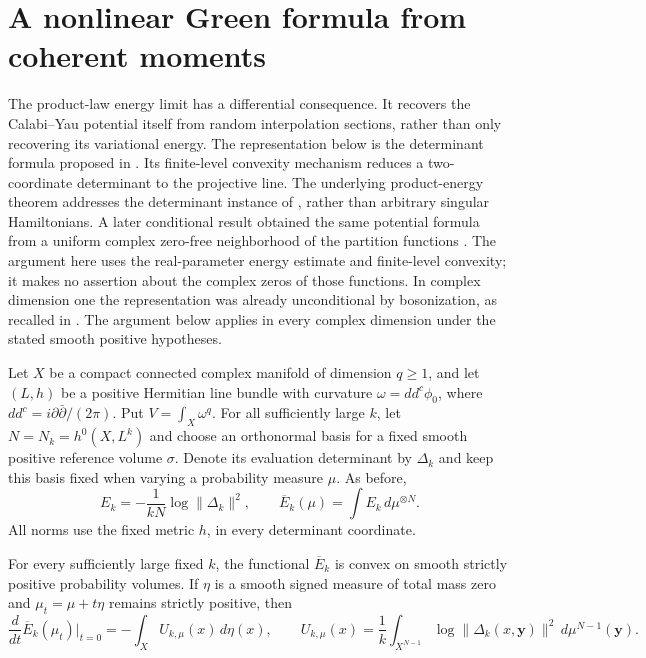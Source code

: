 \section{A nonlinear Green formula from coherent moments}
\label{cy:section}

The product-law energy limit has a differential consequence. It
recovers the Calabi--Yau potential itself from random interpolation
sections, rather than only recovering its variational energy. The
representation below is the determinant formula proposed in
\cite[Conjecture 6.1]{prob_berman2017}. Its finite-level convexity
mechanism reduces a two-coordinate determinant to the projective line.
The underlying product-energy theorem addresses the determinant instance
of \cite[Problem 4.10]{prob_berman2017}, rather than arbitrary singular
Hamiltonians. A later conditional result obtained the same potential
formula from a uniform complex zero-free neighborhood of the partition
functions \cite[Theorems 3.2--3.3]{Berman2023zeta}. The argument here
uses the real-parameter energy estimate and finite-level convexity;
it makes no assertion about the complex zeros of those functions.
In complex dimension one the representation was already unconditional
by bosonization, as recalled in \cite[Remark 3.4]{Berman2023zeta}.
The argument below applies in every complex dimension under the stated
smooth positive hypotheses.

Let $X$ be a compact connected complex manifold of dimension $q\ge1$,
and let $(L,h)$ be a positive Hermitian line bundle with curvature
$\omega=dd^c\phi_0$, where $dd^c=i\partial\bar\partial/(2\pi)$.
Put $V=\int_X\omega^q$. For all sufficiently large $k$, let
$N=N_k=h^0(X,L^k)$ and choose an orthonormal basis for a fixed smooth
positive reference volume $\sigma$. Denote its evaluation determinant
by $\Delta_k$ and keep this basis fixed when varying a probability
measure $\mu$. As before,
\[
 E_k=-\frac1{kN}\log\|\Delta_k\|^2,
 \qquad \overline E_k(\mu)=\int E_k\,d\mu^{\otimes N}.
\]
All norms use the fixed metric $h$, in every determinant coordinate.

\begin{lemma}
\label{cy:finite-convexity}
For every sufficiently large fixed $k$, the functional
$\overline E_k$ is convex on smooth strictly positive probability
volumes. If $\eta$ is a smooth signed measure of total mass zero and
$\mu_t=\mu+t\eta$ remains strictly positive, then
\begin{equation}
 \frac{d}{dt}\overline E_k(\mu_t)\bigg|_{t=0}
 =-\int_X U_{k,\mu}(x)\,d\eta(x),\qquad
 U_{k,\mu}(x)=\frac1k\int_{X^{N-1}}
        \log\|\Delta_k(x,\mathbf y)\|^2\,d\mu^{N-1}(\mathbf y).
 \label{cy:first-variation}
\end{equation}
\end{lemma}

